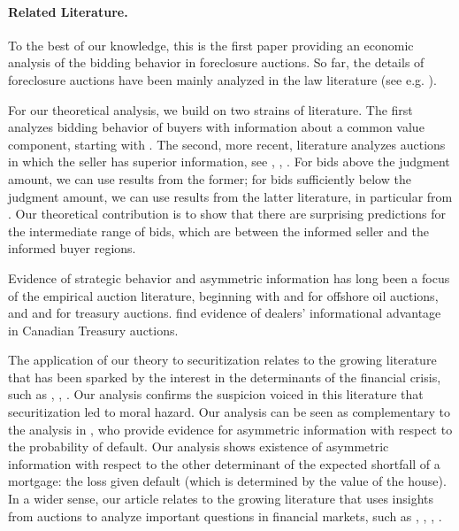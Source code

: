 \documentclass[11pt,twopage]{article}
\begin{document}
\paragraph{Related Literature.} To the best of our knowledge, this is the first paper providing an economic analysis of the bidding behavior in foreclosure auctions. So far, the details of foreclosure auctions have been mainly analyzed in the law literature (see e.g. \cite{nelson2004reforming}).

For our theoretical analysis, we build on two strains of literature. The first analyzes bidding behavior of buyers with information about a common value component, starting with \cite{milgrom1982theory}. The second, more recent, literature analyzes auctions in which the seller has superior information, see \cite{jullien2006auction}, \cite{cai2007reserve}, \cite{lamy}. For bids above the judgment amount, we can use results from the former; for bids sufficiently below the judgment amount, we can use results from the latter literature, in particular from \cite{cai2007reserve}. Our theoretical contribution is to show that there are surprising predictions for the intermediate range of bids, which are between the informed seller and the informed buyer regions.

Evidence of strategic behavior and asymmetric information has long been a focus of the empirical auction literature, beginning with \cite{hendricks1988empirical} and \cite{hendricks2003empirical} for offshore oil auctions, and  \cite{nyborg2002bidder} and \cite{hortaccsu2012valuing} for treasury auctions. \cite{hortaccsu2012valuing} find evidence of dealers' informational advantage in Canadian Treasury auctions.

The application of our theory to securitization relates to the growing literature that has been sparked by the interest in the determinants of the financial crisis, such as \cite{keys2008did}, \cite{brunnermeier2009deciphering}, \cite{tirole2011illiquidity}. Our analysis confirms the suspicion voiced in this literature that securitization led to moral hazard. Our analysis can be seen as complementary to the analysis in \cite{keys2008did}, who provide evidence for asymmetric information with respect to the probability of default. Our analysis shows existence of asymmetric information with respect to the other determinant of the expected shortfall of a mortgage: the loss given default (which is determined by the value of the house).
In a wider sense, our article relates to the growing literature that uses insights from auctions to analyze important questions  in financial markets, such as \cite{heller1998auctions}, \cite{hortacsu2010mechanism}, 
\cite{cassola20132007},  \cite{zulehner2013competition}.
\end{document}
